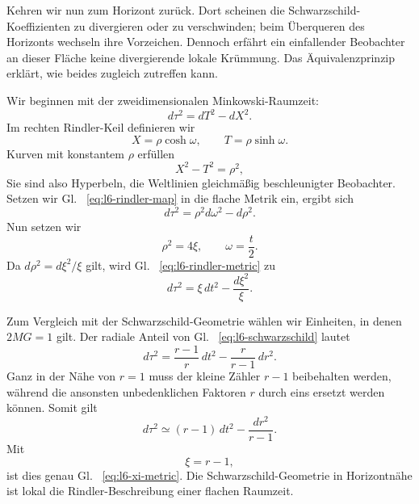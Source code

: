 Kehren wir nun zum Horizont zurück. Dort scheinen die Schwarzschild-Koeffizienten zu divergieren oder zu verschwinden; beim Überqueren des Horizonts wechseln ihre Vorzeichen. Dennoch erfährt ein einfallender Beobachter an dieser Fläche keine divergierende lokale Krümmung. Das Äquivalenzprinzip erklärt, wie beides zugleich zutreffen kann.

Wir beginnen mit der zweidimensionalen Minkowski-Raumzeit:
\begin{equation}
d\tau^{2}=dT^{2}-dX^{2}.
\end{equation}
Im rechten Rindler-Keil definieren wir
\begin{equation}
X=\rho\cosh\omega,
\qquad
T=\rho\sinh\omega.
\label{eq:l6-rindler-map}
\end{equation}
Kurven mit konstantem \(\rho\) erfüllen
\begin{equation}
X^{2}-T^{2}=\rho^{2},
\end{equation}
Sie sind also Hyperbeln, die Weltlinien gleichmäßig beschleunigter Beobachter. Setzen wir Gl. ~\eqref{eq:l6-rindler-map} in die flache Metrik ein, ergibt sich
\begin{equation}
d\tau^{2}
=\rho^{2}d\omega^{2}-d\rho^{2}.
\label{eq:l6-rindler-metric}
\end{equation}
Nun setzen wir
\begin{equation}
\rho^{2}=4\xi,
\qquad
\omega=\frac{t}{2}.
\label{eq:l6-rindler-rescale}
\end{equation}
Da \(d\rho^{2}=d\xi^{2}/\xi\) gilt, wird Gl. ~\eqref{eq:l6-rindler-metric} zu
\begin{equation}
d\tau^{2}
=\xi\,dt^{2}-\frac{d\xi^{2}}{\xi}.
\label{eq:l6-xi-metric}
\end{equation}

\begin{classroomqa}
\end{classroomqa}

Zum Vergleich mit der Schwarzschild-Geometrie wählen wir Einheiten, in denen \(2MG=1\) gilt. Der radiale Anteil von Gl. ~\eqref{eq:l6-schwarzschild} lautet
\begin{equation}
d\tau^{2}
=
\frac{r-1}{r}\,dt^{2}
-
\frac{r}{r-1}\,dr^{2}.
\end{equation}
Ganz in der Nähe von \(r=1\) muss der kleine Zähler \(r-1\) beibehalten werden, während die ansonsten unbedenklichen Faktoren \(r\) durch eins ersetzt werden können. Somit gilt
\begin{equation}
d\tau^{2}
\simeq
(r-1)\,dt^{2}
-
\frac{dr^{2}}{r-1}.
\end{equation}
Mit
\begin{equation}
\xi=r-1,
\end{equation}
ist dies genau Gl. ~\eqref{eq:l6-xi-metric}. Die Schwarzschild-Geometrie in Horizontnähe ist lokal die Rindler-Beschreibung einer flachen Raumzeit.

